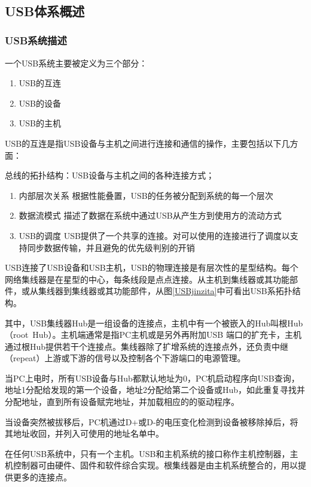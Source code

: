  
\subsection{USB体系概述}
\subsubsection{USB系统描述}
一个USB系统主要被定义为三个部分：
\begin{enumerate}
\item USB的互连
\item USB的设备
\item USB的主机
\end{enumerate}

USB的互连是指USB设备与主机之间进行连接和通信的操作，主要包括以下几方面： 

总线的拓扑结构：USB设备与主机之间的各种连接方式； 

\begin{enumerate}
\item 内部层次关系
根据性能叠置，USB的任务被分配到系统的每一个层次
\item 数据流模式
描述了数据在系统中通过USB从产生方到使用方的流动方式
\item USB的调度
USB提供了一个共享的连接。对可以使用的连接进行了调度以支持同步数据传输，并且避免的优先级判别的开销
\end{enumerate}

USB连接了USB设备和USB主机，USB的物理连接是有层次性的星型结构。每个网络集线器是在星型的中心，每条线段是点点连接。从主机到集线器或其功能部件，或从集线器到集线器或其功能部件，从图\ref{USBjinzita}中可看出USB系拓扑结构。

其中，USB集线器Hub是一组设备的连接点，主机中有一个被嵌入的Hub叫根Hub（root Hub）。主机端通常是指PC主机或是另外再附加USB 端口的扩充卡，主机通过根Hub提供若干个连接点。集线器除了扩增系统的连接点外，还负责中继（repeat）上游或下游的信号以及控制各个下游端口的电源管理。 

当PC上电时，所有USB设备与Hub都默认地址为0，PC机启动程序向USB查询，地址1分配给发现的第一个设备，地址2分配给第二个设备或Hub，如此重复寻找并分配地址，直到所有设备赋完地址，并加载相应的的驱动程序。 

当设备突然被拔移后，PC机通过D+或D-的电压变化检测到设备被移除掉后，将其地址收回，并列入可使用的地址名单中。 

在任何USB系统中，只有一个主机。USB和主机系统的接口称作主机控制器，主机控制器可由硬件、固件和软件综合实现。根集线器是由主机系统整合的，用以提供更多的连接点。 

